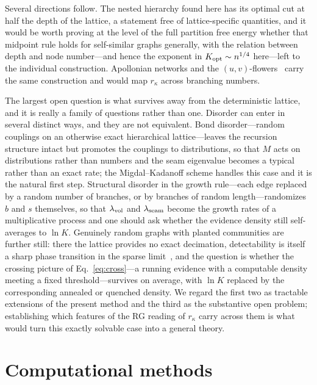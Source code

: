 \documentclass[preprint,12pt]{elsarticle}
\newcommand{\rk}{r_{\kappa}}
\begin{document}
Several directions follow. The nested hierarchy found here has its optimal cut
at half the depth of the lattice, a statement free of lattice-specific
quantities, and it would be worth proving at the level of the full partition
free energy whether that midpoint rule holds for self-similar graphs generally,
with the relation between depth and node number---and hence the exponent in
$K_{\rm opt}\sim n^{1/4}$ here---left to the individual construction.
Apollonian networks and the $(u,v)$-flowers~\cite{rozenfeld2007} carry the same
construction and would map $\rk$ across branching numbers.

The largest open question is what survives away from the deterministic lattice,
and it is really a family of questions rather than one. Disorder can enter in
several distinct ways, and they are not equivalent. Bond disorder---random
couplings on an otherwise exact hierarchical lattice---leaves the recursion
structure intact but promotes the couplings to distributions, so that $M$ acts
on distributions rather than numbers and the seam eigenvalue becomes a typical
rather than an exact rate; the Migdal--Kadanoff scheme handles this case and it
is the natural first step. Structural disorder in the growth rule---each edge
replaced by a random number of branches, or by branches of random
length---randomizes $b$ and $s$ themselves, so that $\lambda_{\rm vol}$ and
$\lambda_{\rm seam}$ become the growth rates of a multiplicative process and
one should ask whether the evidence density still self-averages to $\ln K$.
Genuinely random graphs with planted communities are further still: there the
lattice provides no exact decimation, detectability is itself a sharp phase
transition in the sparse limit~\cite{decelle2011}, and the question is whether
the crossing picture of Eq.~\eqref{eq:cross}---a running evidence with a
computable density meeting a fixed threshold---survives on average, with $\ln
K$ replaced by the corresponding annealed or quenched density. We regard the
first two as tractable extensions of the present method and the third as the
substantive open problem; establishing which features of the RG reading of
$\rk$ carry across them is what would turn this exactly solvable case into a
general theory.

\appendix

\section{Computational methods}
\label{app:methods}
\end{document}
